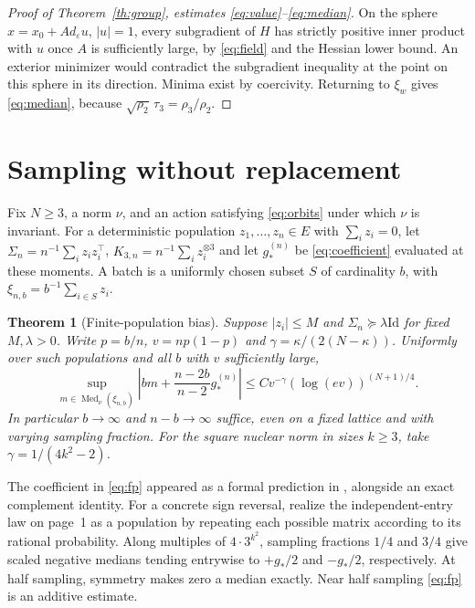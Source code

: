 \documentclass[10pt,letterpaper]{article}
\newtheorem{theorem}{Theorem}
\newcommand{\Med}{\operatorname{Med}}
\newcommand{\id}{\mathrm{Id}}
\newcommand{\eps}{\varepsilon}
\newcommand{\gstar}{g_{\!*}}
\begin{document}
\begin{proof}[Proof of Theorem~\ref{th:group}, estimates \eqref{eq:value}--\eqref{eq:median}]
On the sphere $x=x_0+A d_\eps u$, $|u|=1$, every subgradient of $H$ has strictly positive inner product with $u$ once $A$ is sufficiently large, by \eqref{eq:field} and the Hessian lower bound. An exterior minimizer would contradict the subgradient inequality at the point on this sphere in its direction. Minima exist by coercivity. Returning to $\xi_w$ gives \eqref{eq:median}, because $\sqrt{\rho_2}\,\tau_3=\rho_3/\rho_2$.
\end{proof}

\section{Sampling without replacement}

Fix $N\ge3$, a norm $\nu$, and an action satisfying \eqref{eq:orbits} under which $\nu$ is invariant. For a deterministic population $z_1,\dots,z_n\in E$ with $\sum_i z_i=0$, let $\Sigma_n=n^{-1}\sum_i z_i z_i^\top$, $K_{3,n}=n^{-1}\sum_i z_i^{\otimes3}$ and let $\gstar^{(n)}$ be \eqref{eq:coefficient} evaluated at these moments. A batch is a uniformly chosen subset $S$ of cardinality $b$, with $\xi_{n,b}=b^{-1}\sum_{i\in S}z_i$.

\begin{theorem}[Finite-population bias]\label{th:population}
Suppose $|z_i|\le M$ and $\Sigma_n\succeq\lambda\id$ for fixed $M,\lambda>0$. Write $p=b/n$, $v=np(1-p)$ and $\gamma=\kappa/(2(N-\kappa))$. Uniformly over such populations and all $b$ with $v$ sufficiently large,
\begin{equation}
 \sup_{m\in\Med_\nu(\xi_{n,b})}
 \left| b m + \frac{n-2b}{n-2}\gstar^{(n)}\right|
 \le C v^{-\gamma}(\log(ev))^{(N+1)/4}.
 \label{eq:fp}
\end{equation}
In particular $b\to\infty$ and $n-b\to\infty$ suffice, even on a fixed lattice and with varying sampling fraction. For the square nuclear norm in sizes $k\ge3$, take $\gamma=1/(4k^2-2)$.
\end{theorem}

The coefficient in \eqref{eq:fp} appeared as a formal prediction in \cite[Proposition 18]{pb}, alongside an exact complement identity. For a concrete sign reversal, realize the independent-entry law on page~1 as a population by repeating each possible matrix according to its rational probability. Along multiples of $4\cdot 3^{k^2}$, sampling fractions $1/4$ and $3/4$ give scaled negative medians tending entrywise to $+\gstar/2$ and $-\gstar/2$, respectively. At half sampling, symmetry makes zero a median exactly. Near half sampling \eqref{eq:fp} is an additive estimate.
\end{document}
